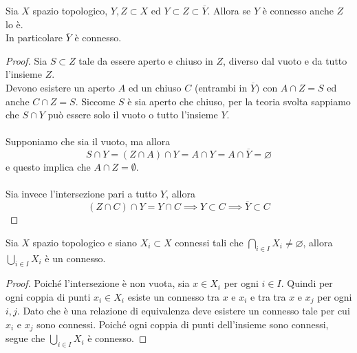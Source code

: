 \begin{theorem}
	Sia $X$ spazio topologico, $Y, Z \subset X$ ed $Y \subset Z\subset \overline{Y}$. Allora se $Y$ è connesso anche $Z$ lo è. \\ In particolare $\overline{Y}$ è connesso.
\end{theorem} 
\begin{proof}
	Sia $S \subset Z$ tale da essere aperto e chiuso in $Z$, diverso dal vuoto e da tutto l'insieme $Z$. \\ Devono esistere un aperto $A$ ed un chiuso $C$ (entrambi in $\overline{Y})$ con $A\cap Z = S$ ed anche $C\cap Z = S$. Siccome $S$ è sia aperto che chiuso, per la teoria svolta sappiamo che $S \cap Y$ può essere solo il vuoto o tutto l'insieme $Y$. \\ \\ Supponiamo che sia il vuoto, ma allora
	\begin{equation*}
	S\cap Y = (Z\cap A)\cap Y=A \cap Y = A \cap \overline{Y}=\varnothing
	\end{equation*}
	e questo implica che $A \cap Z = \emptyset$. \\ \\ Sia invece l'intersezione pari a tutto $Y$, allora
	\begin{equation*}
	(Z \cap C)\cap Y = Y \cap C \implies Y \subset C \implies \overline{Y}\subset C
	\end{equation*}
\end{proof}
\newpage
\begin{theorem}
	Sia $X$ spazio topologico e siano $X_i \subset X$ connessi tali che $\bigcap_{i \in I} X_i \neq \varnothing$, allora $\bigcup_{i \in I} X_i$ è un connesso. 
\end{theorem} 
\begin{proof}
	Poiché l'intersezione è non vuota, sia $x \in X_i$ per ogni $i \in I$. Quindi per ogni coppia di punti $x_i \in X_i$ esiste un connesso tra $x$ e $x_i$ e tra tra $x$ e $x_j$ per ogni $i, j$. Dato che è una relazione di equivalenza deve esistere un connesso tale per cui $x_i$ e $x_j$ sono connessi. Poiché ogni coppia di punti dell'insieme sono connessi, segue che $\bigcup_{i \in I} X_i$ è connesso.
\end{proof}

